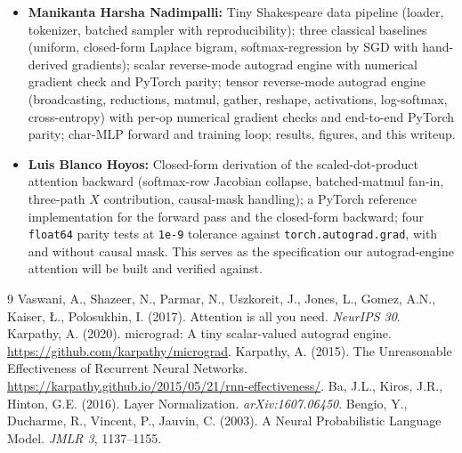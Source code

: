 \documentclass{article}
\begin{document}
\begin{itemize}
\setlength{\itemsep}{0pt}
  \item \textbf{Manikanta Harsha Nadimpalli:} Tiny Shakespeare data pipeline (loader, tokenizer, batched sampler with reproducibility); three classical baselines (uniform, closed-form Laplace bigram, softmax-regression by SGD with hand-derived gradients); scalar reverse-mode autograd engine with numerical gradient check and PyTorch parity; tensor reverse-mode autograd engine (broadcasting, reductions, matmul, gather, reshape, activations, log-softmax, cross-entropy) with per-op numerical gradient checks and end-to-end PyTorch parity; char-MLP forward and training loop; results, figures, and this writeup.
  \item \textbf{Luis Blanco Hoyos:} Closed-form derivation of the scaled-dot-product attention backward (softmax-row Jacobian collapse, batched-matmul fan-in, three-path $X$ contribution, causal-mask handling); a PyTorch reference implementation for the forward pass and the closed-form backward; four \texttt{float64} parity tests at \texttt{1e-9} tolerance against \texttt{torch.autograd.grad}, with and without causal mask. This serves as the specification our autograd-engine attention will be built and verified against.
\end{itemize}

{\footnotesize
\begin{thebibliography}{9}
 Vaswani, A., Shazeer, N., Parmar, N., Uszkoreit, J., Jones, L., Gomez, A.N., Kaiser, {\L}., Polosukhin, I. (2017). Attention is all you need. \textit{NeurIPS 30}.
 Karpathy, A. (2020). micrograd: A tiny scalar-valued autograd engine. \url{https://github.com/karpathy/micrograd}.
 Karpathy, A. (2015). The Unreasonable Effectiveness of Recurrent Neural Networks. \url{https://karpathy.github.io/2015/05/21/rnn-effectiveness/}.
 Ba, J.L., Kiros, J.R., Hinton, G.E. (2016). Layer Normalization. \textit{arXiv:1607.06450}.
 Bengio, Y., Ducharme, R., Vincent, P., Jauvin, C. (2003). A Neural Probabilistic Language Model. \textit{JMLR 3}, 1137--1155.
\end{thebibliography}
}
\end{document}
